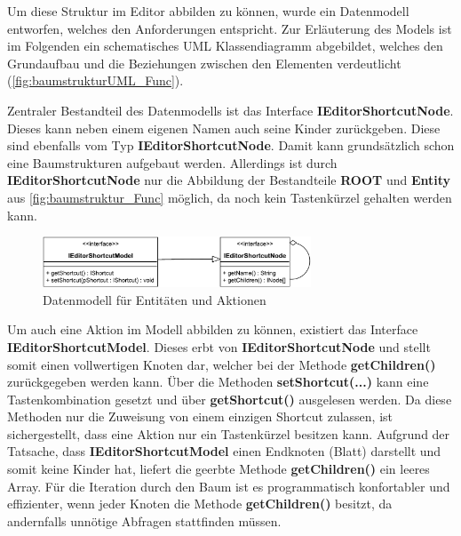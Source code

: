 Um diese Struktur im Editor abbilden zu können, wurde ein Datenmodell entworfen, welches den Anforderungen entspricht. Zur Erläuterung des Models ist im Folgenden ein schematisches UML Klassendiagramm abgebildet, welches den Grundaufbau und die Beziehungen zwischen den Elementen verdeutlicht (\autoref{fig:baumstrukturUML_Func}).

\vfill

Zentraler Bestandteil des Datenmodells ist das Interface \textbf{IEditorShortcutNode}. Dieses kann neben einem eigenen Namen auch seine Kinder zurückgeben. Diese sind ebenfalls vom Typ \textbf{IEditorShortcutNode}. Damit kann grundsätzlich schon eine Baumstrukturen aufgebaut werden. Allerdings ist durch \textbf{IEditorShortcutNode} nur die Abbildung der Bestandteile \textbf{ROOT} und \textbf{Entity} aus \autoref{fig:baumstruktur_Func} möglich, da noch kein Tastenkürzel gehalten werden kann.

\vfill

\begin{figure}[H]
	\vspace{20px}
	\centering
	\includegraphics[height=57px]{../graphic/diagrams/CD_Baumstruktur_Functions/Baumstruktur}
	\caption{Datenmodell für Entitäten und Aktionen}
	\label{fig:baumstrukturUML_Func}
\end{figure}

\vfill

Um auch eine Aktion im Modell abbilden zu können, existiert das Interface \textbf{IEditorShortcutModel}. Dieses erbt von \textbf{IEditorShortcutNode} und stellt somit einen vollwertigen Knoten dar, welcher bei der Methode \textbf{getChildren()} zurückgegeben werden kann. Über die Methoden \textbf{setShortcut(...)} kann eine Tastenkombination gesetzt und über \textbf{getShortcut()} ausgelesen werden. Da diese Methoden nur die Zuweisung von einem einzigen Shortcut zulassen, ist sichergestellt, dass eine Aktion nur ein Tastenkürzel besitzen kann. Aufgrund der Tatsache, dass \textbf{IEditorShortcutModel} einen Endknoten (Blatt) darstellt und somit keine Kinder hat, liefert die geerbte Methode \textbf{getChildren()} ein leeres Array. Für die Iteration durch den Baum ist es programmatisch konfortabler und effizienter, wenn jeder Knoten die Methode \textbf{getChildren()} besitzt, da andernfalls unnötige Abfragen stattfinden müssen.

